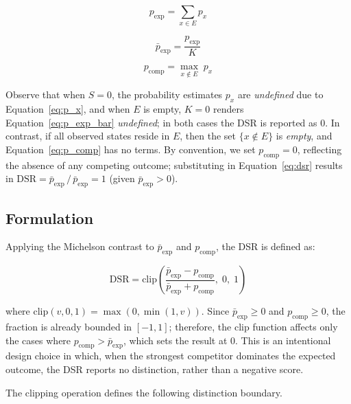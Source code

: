 \documentclass[10pt,conference]{IEEEtran}
\begin{document}
\begin{equation}
\label{eq:p_exp}
    p_{\text{exp}} = \sum_{x \in E} p_x
\end{equation}

\begin{equation}
\label{eq:p_exp_bar}
    \bar{p}_{\text{exp}} = \frac{p_{\text{exp}}}{K}
\end{equation}

\begin{equation}
\label{eq:p_comp}
    p_{\text{comp}} = \max_{x \notin E}\; p_x
\end{equation}

Observe that when $S = 0$, the probability estimates $p_x$ are \emph{undefined} due to Equation~\eqref{eq:p_x}, and when $E$ is empty, $K = 0$ renders Equation~\eqref{eq:p_exp_bar} \emph{undefined}; in both cases the DSR is reported as 0. In contrast, if all observed states reside in $E$, then the set $\{x \notin E\}$ is \emph{empty}, and Equation~\eqref{eq:p_comp} has no terms. By convention, we set $p_{\text{comp}} = 0$, reflecting the absence of any competing outcome; substituting in Equation~\eqref{eq:dsr} results in $\mathrm{DSR} = \bar{p}_{\text{exp}}\,/\,\bar{p}_{\text{exp}} = 1$ (given $\bar{p}_{\text{exp}} > 0$).

\subsection{Formulation}

Applying the Michelson contrast to $\bar{p}_{\text{exp}}$ and $p_{\text{comp}}$, the DSR is defined as:

\begin{equation}
\label{eq:dsr}
\mathrm{DSR} = \mathrm{clip}\!\left(
\frac{\bar{p}_{\text{exp}} - p_{\text{comp}}}
     {\bar{p}_{\text{exp}} + p_{\text{comp}}},\; 0,\; 1\right)
\end{equation}

where $\mathrm{clip}(v, 0, 1) = \max(0, \min(1, v))$. Since $\bar{p}_{\text{exp}} \geq 0$ and $p_{\text{comp}} \geq 0$, the fraction is already bounded in $[-1, 1]$; therefore, the clip function affects only the cases where $p_{\text{comp}} > \bar{p}_{\text{exp}}$, which sets the result at 0. This is an intentional design choice in which, when the strongest competitor dominates the expected outcome, the DSR reports no distinction, rather than a negative score.

The clipping operation defines the following distinction boundary.
\end{document}
